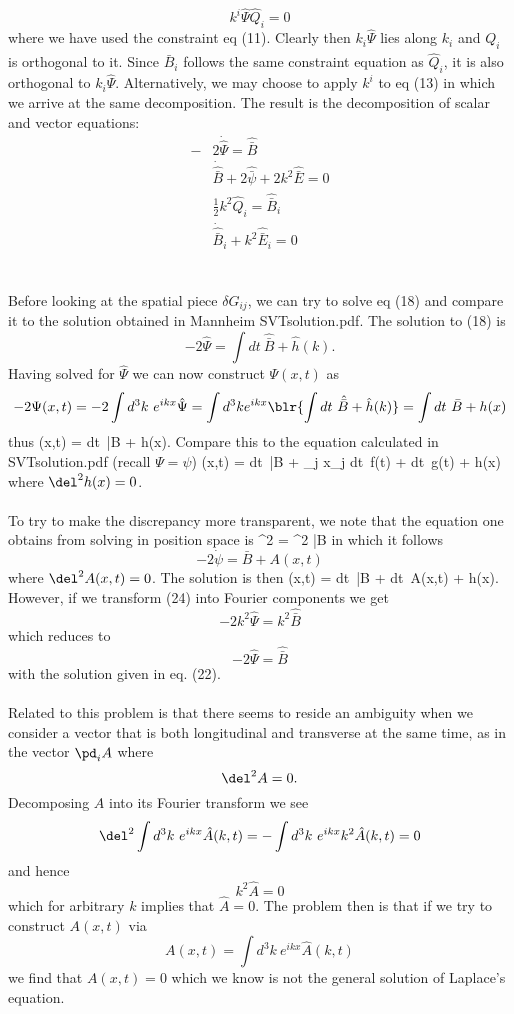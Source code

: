 \documentclass[10pt,letterpaper]{article}
\begin{document}
\[
	k^i \hat \Psi \hat Q_i = 0
\]
where we have used the constraint eq (11). Clearly then $k_i\hat \Psi$ lies along $k_i$ and $Q_i$ is orthogonal to it. Since $\hat{\bar B}_i$ follows the same constraint equation as $\hat Q_i$, it is also orthogonal to $k_i\hat\Psi$. Alternatively, we may choose to apply $k^i$ to eq (13) in which we arrive at the same decomposition. The result is the decomposition of scalar and vector equations:
\begin{align}
-&2\dot{\hat\Psi} = \hat{\bar B}\\
&\dot{\hat{\bar B}} + 2\hat{\bar \psi} + 2k^2 \hat{\bar E} = 0\\
&\frac12 k^2 \hat{Q}_i = \hat{\bar B}_i\\
&\dot{\hat{\bar B}}_i + k^2\hat{\bar E}_i = 0
\end{align}
\\ \\
Before looking at the spatial piece $\delta G_{ij}$, we can try to solve eq (18) and compare it to the solution obtained in Mannheim SVTsolution.pdf. The solution to (18) is
\[
	-2\hat\Psi = \int dt\ \hat{\bar B} + \hat{h}(k).
\]
Having solved for $\hat \Psi$ we can now construct $\Psi(x,t)$ as
\[
	-2\Psi(x,t) = -2\int d^3k\ e^{ikx}\hat\Psi
 = \int d^3k e^{ikx}\blr{ \int dt\ \hat{\bar B} + \hat{h}(k)}= \int dt\ \bar B + h(x)
\]
thus
\Psi(x,t) =  \int dt\ \bar B + h(x).
\ee
Compare this to the equation calculated in SVTsolution.pdf (recall $\Psi = \psi$)
\psi(x,t) = \int dt\ \bar B + \alpha_j x_j \int dt\ f(t) + \int dt\ g(t) + h(x)
\ee
where $\del^2 h(x) = 0$. 
\\ \\
To try to make the discrepancy more transparent, we note that the equation one obtains from solving in position space is
\del^2 \dot \psi = \del^2 \bar B
\ee
in which it follows
\[
	-2\dot \psi = \bar B + A(x,t)
\]
where $\del^2 A(x,t) = 0$. The solution is then
\psi(x,t) = \int dt\ \bar B + \int dt\  A(x,t) + h(x).
\ee
\\ 
However, if we transform (24) into Fourier components we get
\[
	-2k^2 \hat \Psi = k^2 \hat{\bar B}
\]
which reduces to
\[
	-2\hat \Psi = \hat{\bar B}
\]
with the solution given in eq. (22).
\\
\\
Related to this problem is that there seems to reside an ambiguity when we consider a vector that is both longitudinal and transverse at the same time, as in the vector $\pd_i A$ where 
\[
	\del^2 A = 0.
\]
Decomposing $A$ into its Fourier transform we see
\[
	\del^2 \int d^3k\ e^{ikx} \hat A(k,t) = -\int d^3k\ e^{ikx} k^2 \hat A(k,t) =0
\]
and hence
\[
	k^2 \hat A = 0
\]
which for arbitrary $k$ implies that $\hat A = 0$. The problem then is that if we try to construct $A(x,t)$ via
\[
	A(x,t) = \int d^3k\ e^{ikx}\hat A(k,t)
\]
we find that $A(x,t) =0$ which we know is not the general solution of Laplace's equation. 
\end{document}

